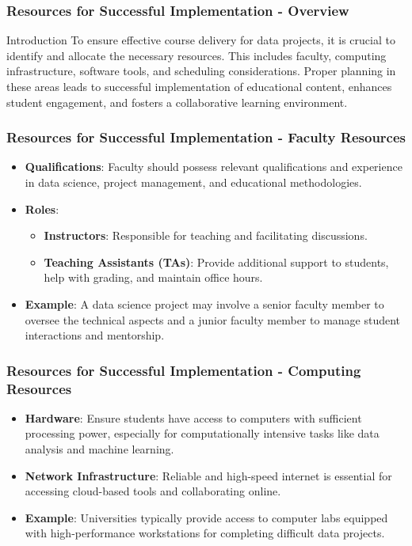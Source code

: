 \documentclass[aspectratio=169]{beamer}
\begin{document}
\begin{frame}[fragile]
    \frametitle{Resources for Successful Implementation - Overview}
    \begin{block}{Introduction}
        To ensure effective course delivery for data projects, it is crucial to identify and allocate the necessary resources. This includes faculty, computing infrastructure, software tools, and scheduling considerations. Proper planning in these areas leads to successful implementation of educational content, enhances student engagement, and fosters a collaborative learning environment.
    \end{block}
\end{frame}

\begin{frame}[fragile]
    \frametitle{Resources for Successful Implementation - Faculty Resources}
    \begin{itemize}
        \item \textbf{Qualifications}: Faculty should possess relevant qualifications and experience in data science, project management, and educational methodologies.
        \item \textbf{Roles}:
        \begin{itemize}
            \item \textbf{Instructors}: Responsible for teaching and facilitating discussions.
            \item \textbf{Teaching Assistants (TAs)}: Provide additional support to students, help with grading, and maintain office hours.
        \end{itemize}
        \item \textbf{Example}: A data science project may involve a senior faculty member to oversee the technical aspects and a junior faculty member to manage student interactions and mentorship.
    \end{itemize}
\end{frame}

\begin{frame}[fragile]
    \frametitle{Resources for Successful Implementation - Computing Resources}
    \begin{itemize}
        \item \textbf{Hardware}: Ensure students have access to computers with sufficient processing power, especially for computationally intensive tasks like data analysis and machine learning.
        \item \textbf{Network Infrastructure}: Reliable and high-speed internet is essential for accessing cloud-based tools and collaborating online.
        \item \textbf{Example}: Universities typically provide access to computer labs equipped with high-performance workstations for completing difficult data projects.
    \end{itemize}
\end{frame}
\end{document}
